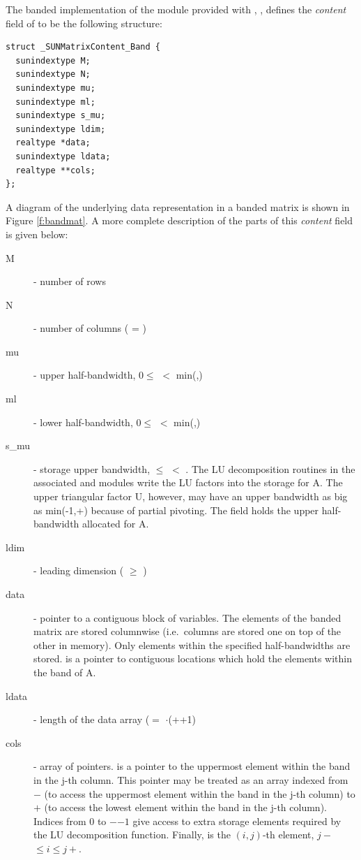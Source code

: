 
The banded implementation of the {\sunmatrix} module provided with
{\sundials}, {\sunmatband}, defines the {\em content} field
of  to be the following structure:
\begin{verbatim} 
struct _SUNMatrixContent_Band {
  sunindextype M;
  sunindextype N;
  sunindextype mu;
  sunindextype ml;
  sunindextype s_mu;
  sunindextype ldim;
  realtype *data;
  sunindextype ldata;
  realtype **cols;
};
\end{verbatim}
A diagram of the underlying data representation in a banded matrix is
shown in Figure \ref{f:bandmat}.  A more complete description of the
parts of this \emph{content} field is given below:
\begin{description}
  \item[M] - number of rows
  \item[N] - number of columns ( = )
  \item[mu] - upper half-bandwidth, $0 \le$  $<$ min(,)
  \item[ml] - lower half-bandwidth, $0 \le$  $<$ min(,)
  \item[s\_mu] - storage upper bandwidth,  $\le$  $<$ .
    The LU decomposition routines in the associated {\sunlinsolband}
    and {\sunlinsollapband} modules write the LU factors into the
    storage for A. The upper triangular factor U, however, may have  
    an upper bandwidth as big as min(-1,+) because of 
    partial pivoting. The  field holds the upper
  half-bandwidth allocated for A.
  \item[ldim] - leading dimension ( $\ge$ )
  \item[data] - pointer to a contiguous block of  variables.
    The elements of the banded matrix are stored columnwise
    (i.e.~columns are stored one on top of the other in memory). Only
    elements within the specified half-bandwidths are stored.     
     is a pointer to  contiguous locations   
    which hold the elements within the band of A.  
  \item[ldata] - length of the data array
    ($=$ $\cdot$(++1) 
  \item[cols] - array of pointers.  is a pointer to the
    uppermost element within the band in the j-th column. This pointer
    may be treated as an array indexed from $-$ (to
    access the uppermost element within the band in the j-th column)
    to $+$ (to access the lowest element within the
    band in the j-th column). Indices from $0$ to
    $-$$-1$ give access to extra storage elements
    required by the LU decomposition function.
    Finally,  is the $(i,j)$-th element,
    $j-$ $\le i \le j+$.  
\end{description}
